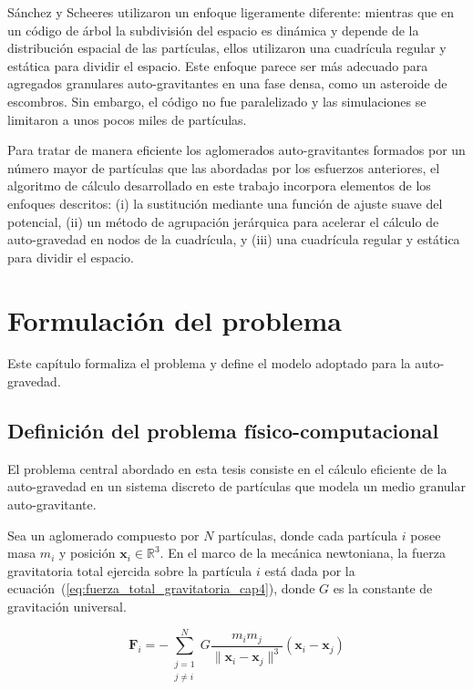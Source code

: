 \documentclass[a4paper,11pt]{book}
\begin{document}
Sánchez y Scheeres \cite{12} utilizaron un enfoque ligeramente diferente: mientras que en un código de árbol la subdivisión del espacio es dinámica y depende de la distribución espacial de las partículas, ellos utilizaron una cuadrícula regular y estática para dividir el espacio. Este enfoque parece ser más adecuado para agregados granulares auto-gravitantes en una fase densa, como un asteroide de escombros. Sin embargo, el código no fue paralelizado y las simulaciones se limitaron a unos pocos miles de partículas.

Para tratar de manera eficiente los aglomerados auto-gravitantes formados por un número mayor de partículas que las abordadas por los esfuerzos anteriores, el algoritmo de cálculo desarrollado en este trabajo incorpora elementos de los enfoques descritos: (i) la sustitución mediante una función de ajuste suave del potencial, (ii) un método de agrupación jerárquica para acelerar el cálculo de auto-gravedad en nodos de la cuadrícula, y (iii) una cuadrícula regular y estática para dividir el espacio.


\chapter{Formulación del problema}
\label{ch:desafio_planteado}

Este capítulo formaliza el problema y define el modelo adoptado para la auto-gravedad.

\section{Definición del problema físico-computacional}

El problema central abordado en esta tesis consiste en el cálculo eficiente de la auto-gravedad en un sistema discreto de partículas que modela un medio granular auto-gravitante.

Sea un aglomerado compuesto por $N$ partículas, donde cada partícula $i$ posee masa $m_i$ y posición $\mathbf{x}_i \in \mathbb{R}^3$. En el marco de la mecánica newtoniana, la fuerza gravitatoria total ejercida sobre la partícula $i$ está dada por la ecuación~(\ref{eq:fuerza_total_gravitatoria_cap4}), donde $G$ es la constante de gravitación universal.

\begin{equation}
	\mathbf{F}_i = - \sum_{\substack{j=1 \\ j \neq i}}^{N}
	G \frac{m_i m_j}{\|\mathbf{x}_i - \mathbf{x}_j\|^3}
	(\mathbf{x}_i - \mathbf{x}_j)
	\label{eq:fuerza_total_gravitatoria_cap4}
\end{equation}
\end{document}
